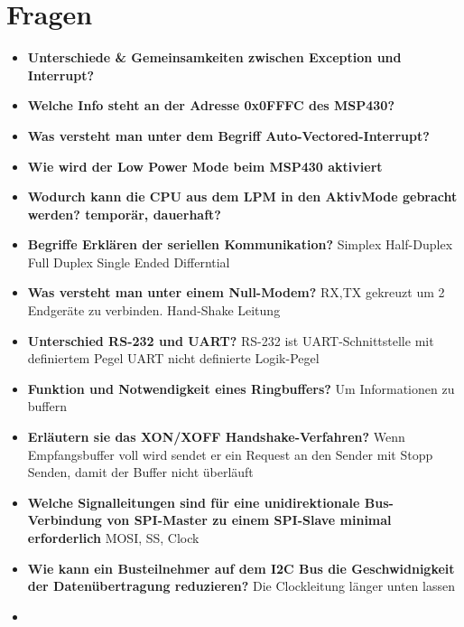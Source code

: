\section{Fragen}
\begin{itemize}
	\item \textbf{Unterschiede \& Gemeinsamkeiten zwischen Exception und Interrupt?}
	
	\item \textbf{Welche Info steht an der Adresse 0x0FFFC des MSP430?}
	
	\item \textbf{Was versteht man unter dem Begriff Auto-Vectored-Interrupt?}
	
	\item \textbf{Wie wird der Low Power Mode beim MSP430 aktiviert}
	
	\item \textbf{Wodurch kann die CPU aus dem LPM in den AktivMode gebracht werden? temporär, dauerhaft?}
	
	\item \textbf{Begriffe Erklären der seriellen Kommunikation?}
	\subitem Simplex
	\subitem Half-Duplex
	\subitem Full Duplex
	\subitem Single Ended
	\subitem Differntial
	
	\item \textbf{Was versteht man unter einem Null-Modem?}
	\subitem RX,TX gekreuzt um 2 Endgeräte zu verbinden. Hand-Shake Leitung
	
	\item \textbf{Unterschied RS-232 und UART?}
	\subitem RS-232 ist UART-Schnittstelle mit definiertem Pegel
	\subitem UART nicht definierte Logik-Pegel
	
	\item \textbf{Funktion und Notwendigkeit eines Ringbuffers?}
	\subitem Um Informationen zu buffern
	
	\item \textbf{Erläutern sie das XON/XOFF Handshake-Verfahren?}
	\subitem Wenn Empfangsbuffer voll wird sendet er ein Request an den Sender mit Stopp Senden, damit der Buffer nicht überläuft
	
	\item \textbf{Welche Signalleitungen sind für eine unidirektionale Bus-Verbindung von SPI-Master zu einem SPI-Slave minimal erforderlich}
	\subitem MOSI, SS, Clock
	
	\item \textbf{Wie kann ein Busteilnehmer auf dem I2C Bus die Geschwidnigkeit der Datenübertragung reduzieren?}
	\subitem Die Clockleitung länger unten lassen
	
	\item \textbf{}
	\subitem 
\end{itemize}




















